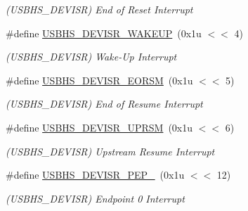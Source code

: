 \begin{DoxyCompactItemize}
\begin{DoxyCompactList}\small\item\em (U\+S\+B\+H\+S\+\_\+\+D\+E\+V\+I\+SR) End of Reset Interrupt \end{DoxyCompactList}\item 
\mbox{\label{group__SAME70__USBHS_ga26789a96cbd9b97ff9c15a1f47f7b58c}} 
\#define \mbox{\hyperlink{group__SAME70__USBHS_ga26789a96cbd9b97ff9c15a1f47f7b58c}{U\+S\+B\+H\+S\+\_\+\+D\+E\+V\+I\+S\+R\+\_\+\+W\+A\+K\+E\+UP}}~(0x1u $<$$<$ 4)
\begin{DoxyCompactList}\small\item\em (U\+S\+B\+H\+S\+\_\+\+D\+E\+V\+I\+SR) Wake-\/\+Up Interrupt \end{DoxyCompactList}\item 
\mbox{\label{group__SAME70__USBHS_gacc3e8ecbd2d67d14c5a2166b1ac8b0cd}} 
\#define \mbox{\hyperlink{group__SAME70__USBHS_gacc3e8ecbd2d67d14c5a2166b1ac8b0cd}{U\+S\+B\+H\+S\+\_\+\+D\+E\+V\+I\+S\+R\+\_\+\+E\+O\+R\+SM}}~(0x1u $<$$<$ 5)
\begin{DoxyCompactList}\small\item\em (U\+S\+B\+H\+S\+\_\+\+D\+E\+V\+I\+SR) End of Resume Interrupt \end{DoxyCompactList}\item 
\mbox{\label{group__SAME70__USBHS_gaf888278280758a1d066109e9f8728b8d}} 
\#define \mbox{\hyperlink{group__SAME70__USBHS_gaf888278280758a1d066109e9f8728b8d}{U\+S\+B\+H\+S\+\_\+\+D\+E\+V\+I\+S\+R\+\_\+\+U\+P\+R\+SM}}~(0x1u $<$$<$ 6)
\begin{DoxyCompactList}\small\item\em (U\+S\+B\+H\+S\+\_\+\+D\+E\+V\+I\+SR) Upstream Resume Interrupt \end{DoxyCompactList}\item 
\mbox{\label{group__SAME70__USBHS_gab1c55f407682832d960812c3c497c6fe}} 
\#define \mbox{\hyperlink{group__SAME70__USBHS_gab1c55f407682832d960812c3c497c6fe}{U\+S\+B\+H\+S\+\_\+\+D\+E\+V\+I\+S\+R\+\_\+\+P\+E\+P\+\_}}~(0x1u $<$$<$ 12)
\begin{DoxyCompactList}\small\item\em (U\+S\+B\+H\+S\+\_\+\+D\+E\+V\+I\+SR) Endpoint 0 Interrupt \end{DoxyCompactList}\item 

\end{DoxyCompactItemize}
